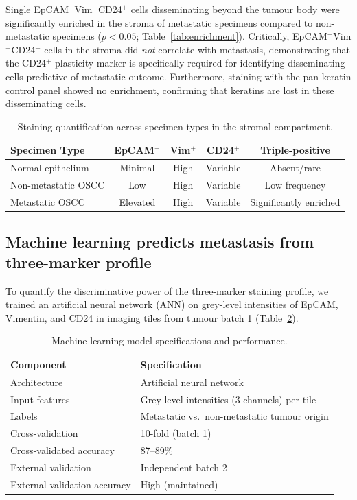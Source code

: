 \documentclass[11pt]{article}
\begin{document}
Single EpCAM$^{+}$Vim$^{+}$CD24$^{+}$ cells disseminating beyond the tumour body were significantly enriched in the stroma of metastatic specimens compared to non-metastatic specimens ($p < 0.05$; Table~\ref{tab:enrichment}). Critically, EpCAM$^{+}$Vim$^{+}$CD24$^{-}$ cells in the stroma did \textit{not} correlate with metastasis, demonstrating that the CD24$^{+}$ plasticity marker is specifically required for identifying disseminating cells predictive of metastatic outcome. Furthermore, staining with the pan-keratin control panel showed no enrichment, confirming that keratins are lost in these disseminating cells.

\begin{table}[ht]
\centering
\caption{Staining quantification across specimen types in the stromal compartment.}
\label{tab:staining}
\begin{tabular}{lcccc}
\toprule
Specimen Type & EpCAM$^{+}$ & Vim$^{+}$ & CD24$^{+}$ & Triple-positive \\
\midrule
Normal epithelium & Minimal & High & Variable & Absent/rare \\
Non-metastatic OSCC & Low & High & Variable & Low frequency \\
Metastatic OSCC & Elevated & High & Variable & Significantly enriched \\
\bottomrule
\end{tabular}
\end{table}

\subsection{Machine learning predicts metastasis from three-marker profile}

To quantify the discriminative power of the three-marker staining profile, we trained an artificial neural network (ANN) on grey-level intensities of EpCAM, Vimentin, and CD24 in imaging tiles from tumour batch 1 (Table~\ref{tab:ml}).

\begin{table}[ht]
\centering
\caption{Machine learning model specifications and performance.}
\label{tab:ml}
\begin{tabular}{ll}
\toprule
Component & Specification \\
\midrule
Architecture & Artificial neural network \\
Input features & Grey-level intensities (3 channels) per tile \\
Labels & Metastatic vs.\ non-metastatic tumour origin \\
Cross-validation & 10-fold (batch 1) \\
Cross-validated accuracy & 87--89\% \\
External validation & Independent batch 2 \\
External validation accuracy & High (maintained) \\
\bottomrule
\end{tabular}
\end{table}
\end{document}
